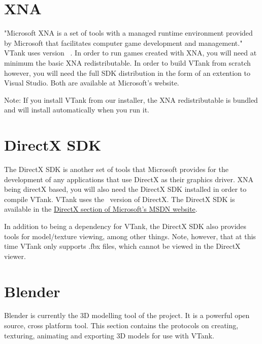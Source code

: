\section{XNA}

"Microsoft XNA is a set of tools with a managed runtime environment provided by Microsoft that facilitates computer game development and management." VTank uses version \XNAVersion\ . In order to run games created with XNA, you will need at minimum the basic XNA redistributable. In order to build VTank from scratch however, you will need the full SDK distribution in the form of an extention to Visual Studio. Both are available at Microsoft's website. 

Note: If you install VTank from our installer, the XNA redistributable is bundled and will install automatically when you run it. 

\section{DirectX SDK}
The DirectX SDK is another set of tools that Microsoft provides for the development of any applications that use DirectX as their graphics driver.  XNA being directX based, you will also need the DirectX SDK installed in order to compile VTank.  VTank uses the \DirectXSDKVersion\ version of DirectX.  The DirectX SDK is available in the \href{http://msdn.microsoft.com/directx/}{DirectX section of Microsoft's MSDN website}.

In addition to being a dependency for VTank, the DirectX SDK also provides tools for model/texture viewing, among other things.  Note, however, that at this time VTank only supports .fbx files, which cannot be viewed in the DirectX viewer.
 
\section{Blender}

Blender is currently the 3D modelling tool of the project. It is a powerful open source, cross platform tool. This section contains the protocols  on creating, texturing, animating and exporting 3D models for use with VTank. 

